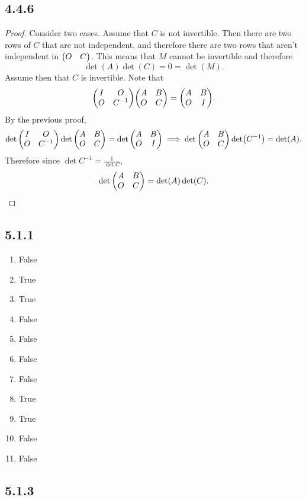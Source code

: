 \documentclass[12pt,titlepage]{extarticle}
\begin{document}
\subsection*{4.4.6}
\begin{proof}
    Consider two cases. Assume that $C$ is not invertible. Then there are two rows of $C$ that are not independent, and therefore there are two rows that aren't independent in $\mqty(O & C)$. This means that $M$ cannot be invertible and therefore
    \[
        \det(A) \det(C) = 0 = \det(M)
    .\]
    Assume then that $C$ is invertible. Note that
    \[
        \mqty(
        I & O \\
        O & C^{-1}
        ) \mqty(
        A & B \\ 
        O & C
        ) = 
        \mqty(
        A & B \\
        O & I
        )
    .\]
    By the previous proof,
    \[
        \det\mqty(
        I & O \\
        O & C^{-1}
        ) \det\mqty(
        A & B \\ 
        O & C
        ) = 
        \det\mqty(
        A & B \\
        O & I
        ) \implies \det\mqty(A & B \\ O & C) \det(C^{-1}) = \det(A)
    .\]
    Therefore since $\det C^{-1} = \frac{1}{\det C}$,
    \[
        \det\mqty(A & B \\ O & C) = \det(A) \det(C)
    .\]
\end{proof}

\subsection*{5.1.1}
\begin{enumerate}[label=\alph*)]
    \item False
    \item True
    \item True
    \item False
    \item False
    \item False
    \item False
    \item True
    \item True
    \item False
    \item False
\end{enumerate}

\subsection*{5.1.3}
\end{document}
